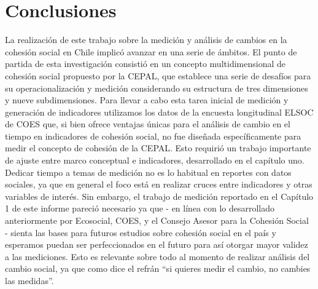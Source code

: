 \documentclass[
  12pt,
]{book}
\begin{document}
\hypertarget{conclusiones}{%
\chapter*{Conclusiones}\label{conclusiones}}

La realización de este trabajo sobre la medición y análisis de cambios en la cohesión social en Chile implicó avanzar en una serie de ámbitos. El punto de partida de esta investigación consistió en un concepto multidimensional de cohesión social propuesto por la CEPAL, que establece una serie de desafíos para su operacionalización y medición considerando su estructura de tres dimensiones y nueve subdimensiones. Para llevar a cabo esta tarea inicial de medición y generación de indicadores utilizamos los datos de la encuesta longitudinal ELSOC de COES que, si bien ofrece ventajas únicas para el análisis de cambio en el tiempo en indicadores de cohesión social, no fue diseñada específicamente para medir el concepto de cohesión de la CEPAL. Esto requirió un trabajo importante de ajuste entre marco conceptual e indicadores, desarrollado en el capítulo uno. Dedicar tiempo a temas de medición no es lo habitual en reportes con datos sociales, ya que en general el foco está en realizar cruces entre indicadores y otras variables de interés. Sin embargo, el trabajo de medición reportado en el Capítulo 1 de este informe pareció necesario ya que - en línea con lo desarrollado anteriormente por Ecosocial, COES, y el Consejo Asesor para la Cohesión Social - sienta las bases para futuros estudios sobre cohesión social en el país y esperamos puedan ser perfeccionados en el futuro para así otorgar mayor validez a las mediciones. Esto es relevante sobre todo al momento de realizar análisis del cambio social, ya que como dice el refrán ``si quieres medir el cambio, no cambies las medidas''.
\end{document}
